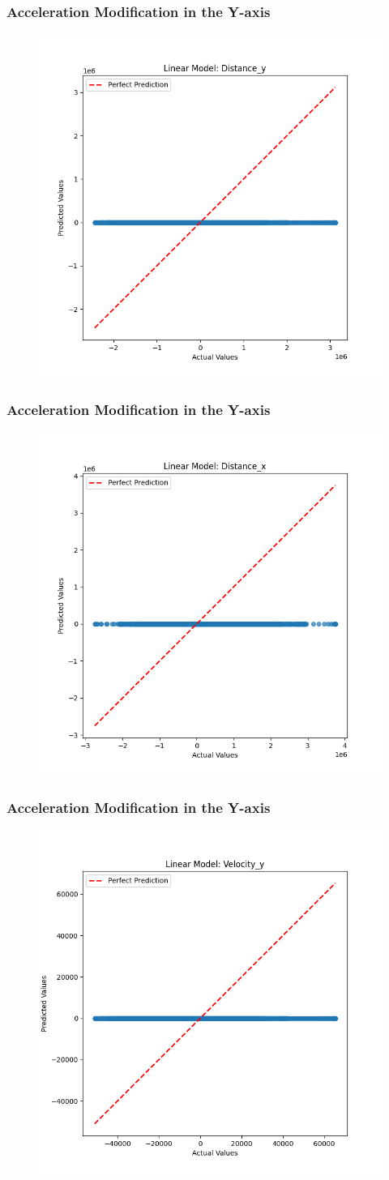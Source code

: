 
\begin{frame}
  \frametitle{Acceleration Modification in the Y-axis}
  \begin{figure}
    \centering
    \includegraphics[width=0.5 \textwidth]{figures/acceleration_mod/acceleration_mod_dist_y.png}
  \end{figure}
\end{frame}


\begin{frame}
  \frametitle{Acceleration Modification in the Y-axis}
  \begin{figure}
    \centering
    \includegraphics[width=0.5 \textwidth]{figures/acceleration_mod/acceleration_mod_dist_x.png}
  \end{figure}
\end{frame}


\begin{frame}
  \frametitle{Acceleration Modification in the Y-axis}
  \begin{figure}
    \centering
    \includegraphics[width=0.5 \textwidth]{figures/acceleration_mod/acceleration_mod_vel_y.png}
  \end{figure}
\end{frame}


